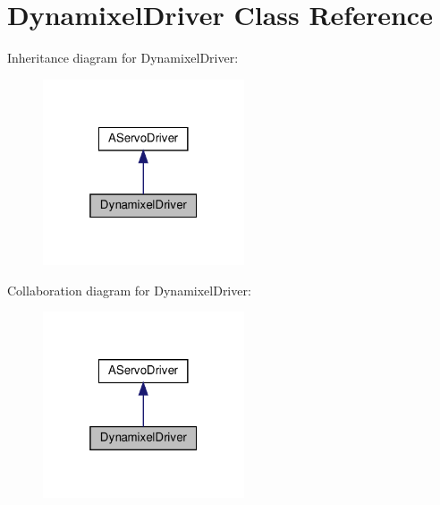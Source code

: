 \hypertarget{classDynamixelDriver}{}\section{Dynamixel\+Driver Class Reference}
\label{classDynamixelDriver}


Inheritance diagram for Dynamixel\+Driver\+:
\nopagebreak
\begin{figure}[H]
\begin{center}
\leavevmode
\includegraphics[width=169pt]{classDynamixelDriver__inherit__graph}
\end{center}
\end{figure}


Collaboration diagram for Dynamixel\+Driver\+:
\nopagebreak
\begin{figure}[H]
\begin{center}
\leavevmode
\includegraphics[width=169pt]{classDynamixelDriver__coll__graph}
\end{center}
\end{figure}
